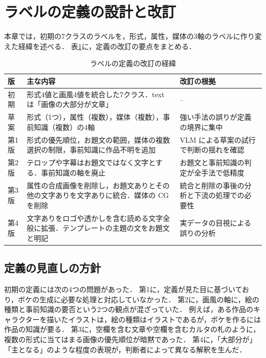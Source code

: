 \section{ラベルの定義の設計と改訂}
\label{sec_label}
本章では，初期の7クラスのラベルを，形式，属性，媒体の3軸のラベルに作り変えた経緯を述べる．
表\ref{tab_label_history}に，定義の改訂の要点をまとめる．

\begin{table}[t]
    \centering
    \caption{ラベルの定義の改訂の経緯}
    \label{tab_label_history}
    \small
    \begin{tabular}{>{\raggedright\arraybackslash}p{}>{\raggedright\arraybackslash}p{}>{\raggedright\arraybackslash}p{}}
        \toprule
        版 & 主な内容 & 改訂の根拠 \\
        \midrule
        初期 & 形式4値と画風4値を統合した7クラス．text は「画像の大部分が文章」 & -- \\
        草案 & 形式（1つ），属性（複数），媒体（複数），事前知識（複数）の4軸 & 強い手法の誤りが定義の境界に集中 \\
        第1版 & 形式の優先順位，お題文の範囲，媒体の複数選択の制限，事前知識に作品不明を追加 & VLM による草案の試行で判断の揺れを確認 \\
        第2版 & テロップや字幕はお題文ではなく文字とする．事前知識の軸を廃止 & お題文と事前知識の判定が全手法で低精度 \\
        第3版 & 属性の合成画像を削除し，お題文ありとその他の文字ありを文字ありに統合．媒体の CG を削除 & 統合と削除の事後の分析と下流の処理での必要性 \\
        第4版 & 文字ありをロゴや透かしを含む読める文字全般に拡張．テンプレートの主題の文をお題文と明記 & 実データの目視による誤りの分析 \\
        \bottomrule
    \end{tabular}
\end{table}

\subsection{定義の見直しの方針}
初期の定義には次の4つの問題があった．
第1に，定義が見た目に基づいており，ボケの生成に必要な処理と対応していなかった．
第2に，画風の軸に，絵の種類と事前知識の要否という2つの観点が混ざっていた．
例えば，ある作品のキャラクターを描いたイラストは，絵の種類はイラストであるが，ボケを作るには作品の知識が要る．
第3に，空欄を含む文章や空欄を含むカルタの札のように，複数の形式に当てはまる画像の優先順位が暗黙であった．
第4に，「大部分が」「主となる」のような程度の表現が，判断者によって異なる解釈を生んだ．

